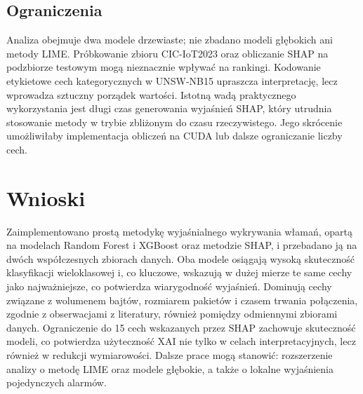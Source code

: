 \documentclass[conference]{IEEEtran}
\begin{document}
\subsection{Ograniczenia}
Analiza obejmuje dwa modele drzewiaste; nie zbadano modeli głębokich ani metody LIME. Próbkowanie zbioru CIC-IoT2023 oraz obliczanie SHAP na podzbiorze testowym mogą nieznacznie wpływać na rankingi. Kodowanie etykietowe cech kategorycznych w UNSW-NB15 upraszcza interpretację, lecz wprowadza sztuczny porządek wartości. Istotną wadą praktycznego wykorzystania jest długi czas generowania wyjaśnień SHAP, który utrudnia stosowanie metody w trybie zbliżonym do czasu rzeczywistego. Jego skrócenie umożliwiłaby implementacja obliczeń na CUDA lub dalsze ograniczanie liczby cech.

\section{Wnioski}
Zaimplementowano prostą metodykę wyjaśnialnego wykrywania włamań, opartą na modelach Random Forest i XGBoost oraz metodzie SHAP, i przebadano ją na dwóch współczesnych zbiorach danych. Oba modele osiągają wysoką skuteczność klasyfikacji wieloklasowej i, co kluczowe, wskazują w dużej mierze te same cechy jako najważniejsze, co potwierdza wiarygodność wyjaśnień. Dominują cechy związane z wolumenem bajtów, rozmiarem pakietów i czasem trwania połączenia, zgodnie z obserwacjami z literatury, również pomiędzy odmiennymi zbiorami danych. Ograniczenie do 15 cech wskazanych przez SHAP zachowuje skuteczność modeli, co potwierdza użyteczność XAI nie tylko w celach interpretacyjnych, lecz również w redukcji wymiarowości. Dalsze prace mogą stanowić: rozszerzenie analizy o metodę LIME oraz modele głębokie, a także o lokalne wyjaśnienia pojedynczych alarmów.



\end{document}
